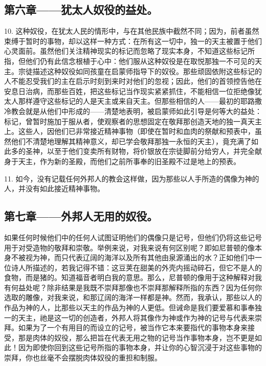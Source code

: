 \subsection{第六章——犹太人奴役的益处。}

10. 这种奴役，在犹太人民的情形中，与在其他民族中截然不同；因为，前者虽然束缚于暂时的事物，却以这样一种方式：在所有这一切中，独一的天主被置于他们心灵面前。虽然他们关注精神现实的标记而忽略了现实本身，不知道这些标记所指，但他们仍有此信念根植于心中：他们服从这种奴役是在取悦那独一不可见的天主。宗徒描述这种奴役如同孩童在启蒙师指导下的奴役。那些顽固依附这些标记的人不能忍受我们的主在启示时刻到来时对他们的忽视；因此，他们的首领控告他在安息日治病，而那些百姓，把这些标记当作现实紧紧抓住，不能相信一位拒绝像犹太人那样遵守这些标记的人是天主或来自天主。但那些相信的人——最初的耶路撒冷教会就是从他们中形成的——清楚地表明，被启蒙师如此引导是何等大的益处：标记，曾暂时施加于服从者，使观察者的思想固定在敬拜那创造天地的独一真天主上。这些人，因他们已非常接近精神事物（即使在暂时和血肉的祭献和预表中，虽然他们不清楚地理解其精神意义，却已学会敬拜那独一永恒的天主），竟充满了如此多的圣神，以至于他们变卖所有财物，将价银放在宗徒脚前分给穷人，并完全献身于天主，作为新的圣殿，而他们之前所事奉的旧圣殿不过是地上的预表。\par

11. 如今，没有记载任何外邦人的教会这样做，因为那些以人手所造的偶像为神的人，并没有如此接近精神事物。\par


\subsection{第七章——外邦人无用的奴役。}

如果任何时候他们中的任何人试图证明他们的偶像只是记号，但他们仍将这些记号用于对受造物的敬拜和崇敬。举例来说，对我来说有何区别呢？即如尼普顿的像本身不被视为神，而只代表辽阔的海洋以及所有其他由泉源涌出的水？正如他们中一位诗人所描述的，若我记得不错：这豆荚在甜美的外壳内摇动碎石，但它不是人的食物，而是猪的。知道福音者明白我的意思。那么，尼普顿的像用于这种解释对我有何益处呢？除非结果是我既不崇拜那像也不崇拜那解释所指的东西？因为任何你选取的雕像，对我来说，和那辽阔的海洋一样都是神。然而，我承认，那些以人的作品为神的人，比那些以天主的作品为神的人更低。但诫命是我们要爱慕和事奉独一的天主，祂是这一切的创造者，外邦人将其像作为神或作为神的记号与代表来崇拜。如果为了一个有用目的而设立的记号，被当作它本来要指代的事物本身来接受，那是肉体的奴役，那么把旨在代表无用之物的记号当作事物本身，岂不更是如此！因为即使你回到这些记号所指的事物本身，并让你的心智沉浸于对这些事物的崇拜，你也丝毫不会摆脱肉体奴役的重担和制服。\par

